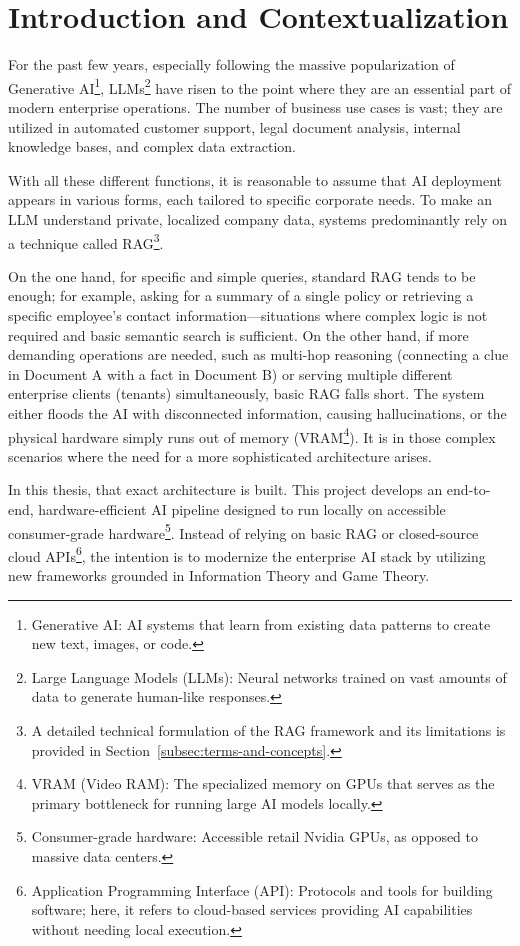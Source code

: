 \section{Introduction and Contextualization}
\label{sec:introduction-and-contextualization}

For the past few years, especially following the massive popularization of Generative AI\footnote{Generative AI: AI systems that learn from existing data patterns to create new text, images, or code.}, LLMs\footnote{Large Language Models (LLMs): Neural networks trained on vast amounts of data to generate human-like responses.} have risen to the point where they are an essential part of modern enterprise operations. The number of business use cases is vast; they are utilized in automated customer support, legal document analysis, internal knowledge bases, and complex data extraction. 

With all these different functions, it is reasonable to assume that AI deployment appears in various forms, each tailored to specific corporate needs. To make an LLM understand private, localized company data, systems predominantly rely on a technique called RAG\footnote{A detailed technical formulation of the RAG framework and its limitations is provided in Section~\ref{subsec:terms-and-concepts}.}. 

On the one hand, for specific and simple queries, standard RAG tends to be enough; for example, asking for a summary of a single policy or retrieving a specific employee's contact information—situations where complex logic is not required and basic semantic search is sufficient. On the other hand, if more demanding operations are needed, such as multi-hop reasoning (connecting a clue in Document A with a fact in Document B) or serving multiple different enterprise clients (tenants) simultaneously, basic RAG falls short\cite{trivedi2023ircot}. The system either floods the AI with disconnected information, causing hallucinations, or the physical hardware simply runs out of memory (VRAM\footnote{VRAM (Video RAM): The specialized memory on GPUs that serves as the primary bottleneck for running large AI models locally.})\cite{barnett2024seven}. It is in those complex scenarios where the need for a more sophisticated architecture arises.

In this thesis, that exact architecture is built. This project develops an end-to-end, hardware-efficient AI pipeline designed to run locally on accessible consumer-grade hardware\footnote{Consumer-grade hardware: Accessible retail Nvidia GPUs, as opposed to massive data centers.}. Instead of relying on basic RAG or closed-source cloud APIs\footnote{Application Programming Interface (API): Protocols and tools for building software; here, it refers to cloud-based services providing AI capabilities without needing local execution.}, the intention is to modernize the enterprise AI stack by utilizing new frameworks grounded in Information Theory and Game Theory.

